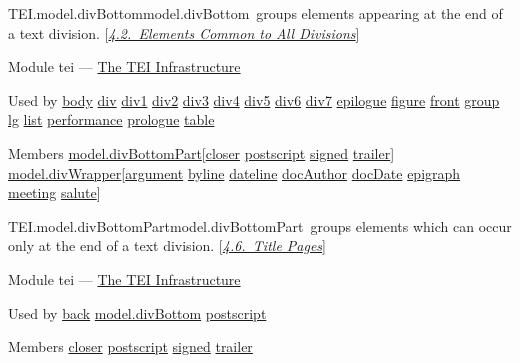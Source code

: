 \begin{reflist}
\item[]\begin{specHead}{TEI.model.divBottom}{model.divBottom} groups elements appearing at the end of a text division. [\textit{\hyperref[DSDTB]{4.2.\ Elements Common to All Divisions}}]\end{specHead} 
    \item[{Module}]
  tei — \hyperref[ST]{The TEI Infrastructure}
    \item[{Used by}]
  \hyperref[TEI.body]{body} \hyperref[TEI.div]{div} \hyperref[TEI.div1]{div1} \hyperref[TEI.div2]{div2} \hyperref[TEI.div3]{div3} \hyperref[TEI.div4]{div4} \hyperref[TEI.div5]{div5} \hyperref[TEI.div6]{div6} \hyperref[TEI.div7]{div7} \hyperref[TEI.epilogue]{epilogue} \hyperref[TEI.figure]{figure} \hyperref[TEI.front]{front} \hyperref[TEI.group]{group} \hyperref[TEI.lg]{lg} \hyperref[TEI.list]{list} \hyperref[TEI.performance]{performance} \hyperref[TEI.prologue]{prologue} \hyperref[TEI.table]{table}
    \item[{Members}]
  \hyperref[TEI.model.divBottomPart]{model.divBottomPart}[\hyperref[TEI.closer]{closer} \hyperref[TEI.postscript]{postscript} \hyperref[TEI.signed]{signed} \hyperref[TEI.trailer]{trailer}] \hyperref[TEI.model.divWrapper]{model.divWrapper}[\hyperref[TEI.argument]{argument} \hyperref[TEI.byline]{byline} \hyperref[TEI.dateline]{dateline} \hyperref[TEI.docAuthor]{docAuthor} \hyperref[TEI.docDate]{docDate} \hyperref[TEI.epigraph]{epigraph} \hyperref[TEI.meeting]{meeting} \hyperref[TEI.salute]{salute}]
\end{reflist}  
\begin{reflist}
\item[]\begin{specHead}{TEI.model.divBottomPart}{model.divBottomPart} groups elements which can occur only at the end of a text division. [\textit{\hyperref[DSTITL]{4.6.\ Title Pages}}]\end{specHead} 
    \item[{Module}]
  tei — \hyperref[ST]{The TEI Infrastructure}
    \item[{Used by}]
  \hyperref[TEI.back]{back} \hyperref[TEI.model.divBottom]{model.divBottom} \hyperref[TEI.postscript]{postscript}
    \item[{Members}]
  \hyperref[TEI.closer]{closer} \hyperref[TEI.postscript]{postscript} \hyperref[TEI.signed]{signed} \hyperref[TEI.trailer]{trailer}
\end{reflist}  

